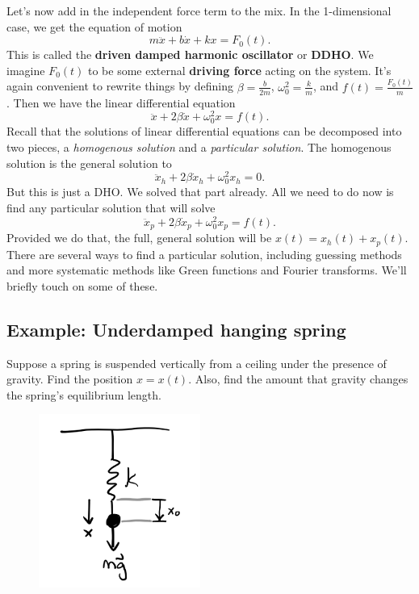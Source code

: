 \documentclass[
  letterpaper,
  DIV=11,
  numbers=noendperiod]{scrreprt}
\begin{document}
Let's now add in the independent force term to the mix. In the
1-dimensional case, we get the equation of motion \[
m \ddot x + b \dot x + kx = F_0(t).
\] This is called the \textbf{driven damped harmonic oscillator} or
\textbf{DDHO}. We imagine \(F_0(t)\) to be some external \textbf{driving
force} acting on the system. It's again convenient to rewrite things by
defining \(\beta = \frac{b}{2m}\), \(\omega_0^2 = \frac{k}{m}\), and
\(f(t) = \frac{F_0(t)}{m}\). Then we have the linear differential
equation \[
\ddot x + 2\beta\dot x + \omega_0^2 x = f(t).
\] Recall that the solutions of linear differential equations can be
decomposed into two pieces, a \emph{homogenous solution} and a
\emph{particular solution}. The homogenous solution is the general
solution to \[
\ddot x_h + 2\beta\dot x_h + \omega_0^2 x_h = 0.
\] But this is just a DHO. We solved that part already. All we need to
do now is find any particular solution that will solve \[
\ddot x_p + 2\beta\dot x_p + \omega_0^2 x_p = f(t).
\] Provided we do that, the full, general solution will be
\(x(t) = x_h(t) + x_p(t)\). There are several ways to find a particular
solution, including guessing methods and more systematic methods like
Green functions and Fourier transforms. We'll briefly touch on some of
these.

\hypertarget{example-underdamped-hanging-spring}{%
\subsection{Example: Underdamped hanging
spring}\label{example-underdamped-hanging-spring}}

Suppose a spring is suspended vertically from a ceiling under the
presence of gravity. Find the position \(x=x(t)\). Also, find the amount
that gravity changes the spring's equilibrium length.

\begin{figure}

{\centering \includegraphics[width=2.08333in,height=\textheight]{classical-mechanics/./resources/image-20230215134622171.png}

}

\end{figure}
\end{document}

